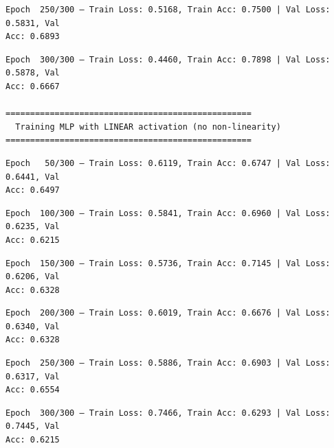 \documentclass[11pt]{article}
\begin{document}
    \begin{Verbatim}[commandchars=\\\{\}]
Epoch  250/300 — Train Loss: 0.5168, Train Acc: 0.7500 | Val Loss: 0.5831, Val
Acc: 0.6893
    \end{Verbatim}

    \begin{Verbatim}[commandchars=\\\{\}]
Epoch  300/300 — Train Loss: 0.4460, Train Acc: 0.7898 | Val Loss: 0.5878, Val
Acc: 0.6667

==================================================
  Training MLP with LINEAR activation (no non-linearity)
==================================================
    \end{Verbatim}

    \begin{Verbatim}[commandchars=\\\{\}]
Epoch   50/300 — Train Loss: 0.6119, Train Acc: 0.6747 | Val Loss: 0.6441, Val
Acc: 0.6497
    \end{Verbatim}

    \begin{Verbatim}[commandchars=\\\{\}]
Epoch  100/300 — Train Loss: 0.5841, Train Acc: 0.6960 | Val Loss: 0.6235, Val
Acc: 0.6215
    \end{Verbatim}

    \begin{Verbatim}[commandchars=\\\{\}]
Epoch  150/300 — Train Loss: 0.5736, Train Acc: 0.7145 | Val Loss: 0.6206, Val
Acc: 0.6328
    \end{Verbatim}

    \begin{Verbatim}[commandchars=\\\{\}]
Epoch  200/300 — Train Loss: 0.6019, Train Acc: 0.6676 | Val Loss: 0.6340, Val
Acc: 0.6328
    \end{Verbatim}

    \begin{Verbatim}[commandchars=\\\{\}]
Epoch  250/300 — Train Loss: 0.5886, Train Acc: 0.6903 | Val Loss: 0.6317, Val
Acc: 0.6554
    \end{Verbatim}

    \begin{Verbatim}[commandchars=\\\{\}]
Epoch  300/300 — Train Loss: 0.7466, Train Acc: 0.6293 | Val Loss: 0.7445, Val
Acc: 0.6215
    \end{Verbatim}
\end{document}
